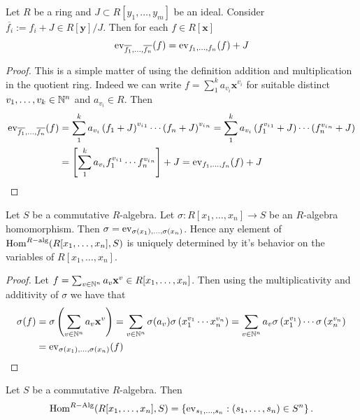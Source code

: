 \begin{lemma}\label{EvaluationCommutesWithTakingQuotient}
    Let $R$ be a ring and $J\subset R[y_1,\dots,y_m]$ be an ideal. Consider $\overline{f_i}:=f_i+J\in R[\mathbf{y}]/J$. Then for each $f\in R[\mathbf{x}]$
    $$\mathrm{ev}_{\overline{f_1},\dots,\overline{f_n}}(f) = \mathrm{ev}_{f_1,\dots,f_n}(f)+J$$
\end{lemma}
\begin{proof}
    This is a simple matter of using the definition addition and multiplication in the quotient ring. Indeed we can write $f=\sum_1^k a_{v_i}\mathbf{x}^{v_i}$ for suitable distinct $v_1,\dots,v_k\in \mathbb{N}^n$ and $a_{v_i}\in R$. Then 
    \begin{align*}
        \mathrm{ev}_{\overline{f_1},\dots,\overline{f_n}}(f) &= \sum_1^k a_{v_i}\left(f_1+J \right)^{{v_i}_1}\cdots \left(f_n+J \right)^{{v_i}_n} =\sum_1^k a_{v_i}\left(f_1^{{v_i}_1}+J \right)\cdots \left(f_n^{{v_i}_n}+J \right)\\ &= \left[\sum_1^k a_{v_i} f_1^{{v_i}_1}\cdots f_n^{{v_i}_n}\right] + J
        = \mathrm{ev}_{f_1,\dots,f_n}(f)+J
    \end{align*}
\end{proof}
\begin{proposition}\label{ClasificationOfAlgebraMaps}
    Let $S$ be a commutative $R$-algebra. Let $\sigma : R[x_1,\dots,x_n] \rightarrow S$ be an $R$-algebra homomorphism. Then $\sigma = \mathrm{ev}_{\sigma(x_1),\dots,\sigma(x_n)}$. Hence any element of $\mathrm{Hom}^{R-\text{alg}}(R[x_1,\dots,x_n],S)$ is uniquely determined by it's behavior on the variables of $R[x_1,\dots,x_n]$.  
\end{proposition}
\begin{proof}
    Let $f= \sum_{v\in \mathbb{N}^n} a_v\mathbf{x}^v\in R[x_1,\dots,x_n]$. Then using the multiplicativity and additivity of $\sigma$ we have that 
    \begin{align*}
        \sigma(f) &= \sigma\left(\sum_{v\in \mathbb{N}^n} a_v\mathbf{x}^v\right) = \sum_{v\in \mathbb{N}^n} \sigma(a_v) \sigma\left(x_1^{v_1}\cdots x_n^{v_n}\right) = \sum_{v\in \mathbb{N}^n} a_v\sigma\left(x_1^{v_1}\right)\cdots\sigma\left(x_n^{v_n}\right)\\
        &= \mathrm{ev}_{\sigma(x_1),\dots,\sigma(x_n)}(f)
    \end{align*}
\end{proof}
\begin{corollary}\label{AlgebraHomomorphismFromPolynomialRingIsJustEvaluation}
    Let $S$ be a commutative $R$-algebra. Then 
    $$\mathrm{Hom}^{R-\text{Alg}}(R[x_1,\dots,x_n],S) = \left\{ \mathrm{ev}_{s_1,\dots,s_n} : (s_1,\dots,s_n)\in S^n \right\}.$$
\end{corollary}
